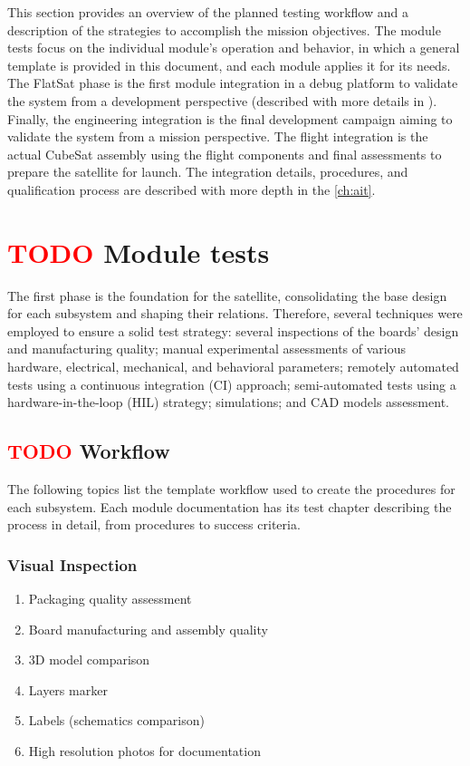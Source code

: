 This section provides an overview of the planned testing workflow and a description of the strategies to accomplish the mission objectives. The module tests focus on the individual module's operation and behavior, in which a general template is provided in this document, and each module applies it for its needs. The FlatSat phase is the first module integration in a debug platform to validate the system from a development perspective (described with more details in \cite{flatsat}). Finally, the engineering integration is the final development campaign aiming to validate the system from a mission perspective. The flight integration is the actual CubeSat assembly using the flight components and final assessments to prepare the satellite for launch. The integration details, procedures, and qualification process are described with more depth in the \autoref{ch:ait}. %


\section{ \textcolor{red}{TODO} Module tests}

The first phase is the foundation for the satellite, consolidating the base design for each subsystem and shaping their relations. Therefore, several techniques were employed to ensure a solid test strategy: several inspections of the boards' design and manufacturing quality; manual experimental assessments of various hardware, electrical, mechanical, and behavioral parameters; remotely automated tests using a continuous integration (CI) approach; semi-automated tests using a hardware-in-the-loop (HIL) strategy; simulations; and CAD models assessment.

\subsection{ \textcolor{red}{TODO} Workflow}

The following topics list the template workflow used to create the procedures for each subsystem. Each module documentation has its test chapter describing the process in detail, from procedures to success criteria.

\subsubsection{Visual Inspection} 
\begin{enumerate} \setlength\itemsep{-0.3em}
    \item Packaging quality assessment
    \item Board manufacturing and assembly quality
    \item 3D model comparison
    \item Layers marker
    \item Labels (schematics comparison) 
    \item High resolution photos for documentation
\end{enumerate}

